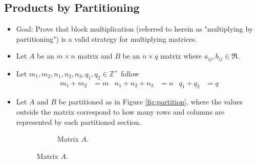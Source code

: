 \documentclass[titlepage]{article}
\numberwithin{figure}{section}
\numberwithin{equation}{section}
\numberwithin{theorem}{section}
\begin{document}
\subsection{Products by Partitioning}
\begin{itemize}
    \item Goal: Prove that block multiplication (referred to herein as "multiplying by partitioning") is a valid strategy for multiplying matrices.
    \item Let $A$ be an $m\times n$ matrix and $B$ be an $n\times q$ matrix where $a_{ij},b_{ij}\in\mathfrak{R}$.
    \item Let $m_1,m_2,n_1,n_2,n_3,q_1,q_2\in\mathbb{Z}^+$ follow
    \begin{align*}
        m_1+m_2 &= m & n_1+n_2+n_3 &= n & q_1+q_2 &= q
    \end{align*}
    \item Let $A$ and $B$ be partitioned as in Figure \ref{fig:partition}, where the values outside the matrix correspond to how many rows and columns are represented by each partitioned section.
    \begin{figure}[h!]
        \centering
        \begin{subfigure}[b]{0.3\linewidth}
            \centering
            \caption{Matrix $A$.}
            \label{fig:partitiona}
        \end{subfigure}

\end{figure}
\end{itemize}
\end{document}
